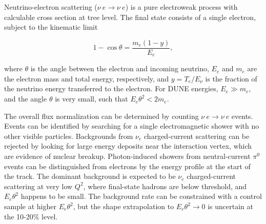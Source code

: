 

Neutrino-electron scattering ($\nu \ e \rightarrow \nu \ e$) is a pure electroweak process with calculable cross section at tree level. The final state consists of a single electron, subject to the kinematic limit 

\begin{equation}
1 - \cos \theta = \frac{m_{e}(1-y)}{E_{e}},
\end{equation}

where $\theta$ is the angle between the electron and incoming neutrino, $E_{e}$ and $m_{e}$ are the electron mass and total energy, respectively, and $y = T_{e}/E_{\nu}$ is the fraction of the neutrino energy transferred to the electron. For DUNE energies, $E_{e} \gg m_{e}$, and the angle $\theta$ is very small, such that $E_{e}\theta^{2} < 2m_{e}$. 

The overall flux normalization can be determined by counting $\nu \ e \rightarrow \nu \ e$ events. Events can be identified by searching for a single electromagnetic shower with no other visible particles. Backgrounds from $\nu_{e}$ charged-current scattering can be rejected by looking for large energy deposits near the interaction vertex, which are evidence of nuclear breakup. Photon-induced showers from neutral-current $\pi^{0}$ events can be distinguished from electrons by the energy profile at the start of the track. The dominant background is expected to be $\nu_{e}$ charged-current scattering at very low $Q^{2}$, where final-state hadrons are below threshold, and $E_{e}\theta^{2}$ happens to be small. The background rate can be constrained with a control sample at higher $E_{e}\theta^{2}$, but the shape extrapolation to $E_{e}\theta^{2} \rightarrow 0$ is uncertain at the 10-20\% level.

